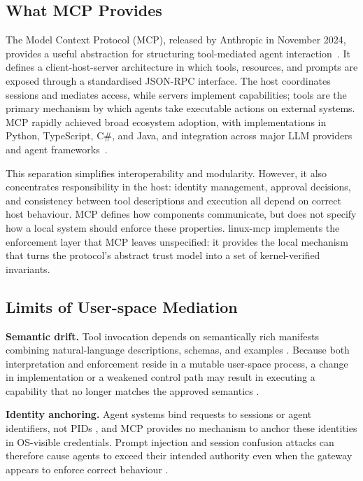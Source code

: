 \subsection{What MCP Provides}

The Model Context Protocol (MCP), released by Anthropic in November 2024, provides a useful abstraction for structuring tool-mediated agent interaction~\cite{mcp2025}.
It defines a client-host-server architecture in which tools, resources, and prompts are exposed through a standardised JSON-RPC interface.
The host coordinates sessions and mediates access, while servers implement capabilities; tools are the primary mechanism by which agents take executable actions on external systems.
MCP rapidly achieved broad ecosystem adoption, with implementations in Python, TypeScript, C\#, and Java, and integration across major LLM providers and agent frameworks~\cite{mcp_anniversary_2025}.

This separation simplifies interoperability and modularity.
However, it also concentrates responsibility in the host: identity management, approval decisions, and consistency between tool descriptions and execution all depend on correct host behaviour.
MCP defines how components communicate, but does not specify how a local system should enforce these properties.
linux-mcp implements the enforcement layer that MCP leaves unspecified: it provides the local mechanism that turns the protocol's abstract trust model into a set of kernel-verified invariants.



\subsection{Limits of User-space Mediation}
\label{sec:limits-user-space}

\textbf{Semantic drift.}
Tool invocation depends on semantically rich manifests combining natural-language descriptions, schemas, and examples \cite{schick2023toolformer, patil2023gorilla, mcp2025}.
Because both interpretation and enforcement reside in a mutable user-space process, a change in implementation or a weakened control path may result in executing a capability that no longer matches the approved semantics \cite{liu2023prompt}.

\textbf{Identity anchoring.}
Agent systems bind requests to sessions or agent identifiers, not PIDs \cite{yao2023react, autogpt2023, park2023generative}, and MCP provides no mechanism to anchor these identities in OS-visible credentials.
Prompt injection and session confusion attacks can therefore cause agents to exceed their intended authority even when the gateway appears to enforce correct behaviour \cite{greshake2023prompt, openclaw_security1, openclaw_security2}.

